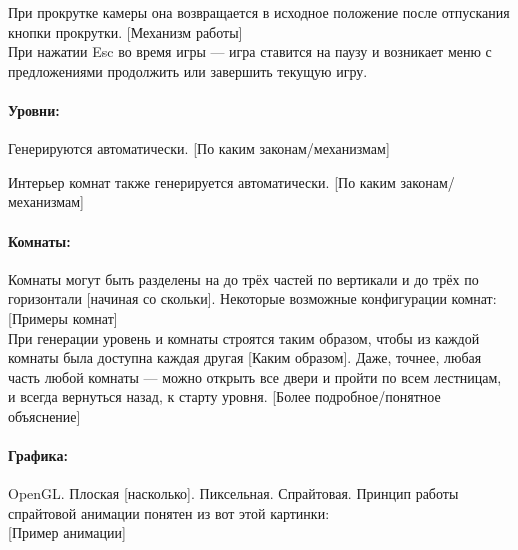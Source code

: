 \documentclass[12pt,a4paper]{article}
\begin{document}
При прокрутке камеры она возвращается в исходное положение после отпускания кнопки прокрутки. {\color{red} [Механизм работы]}\\

При нажатии Esc во время игры --- игра ставится на паузу и возникает меню с предложениями продолжить или завершить текущую игру.

\paragraph{Уровни:}
Генерируются автоматически. {\color{red} [По каким законам/механизмам]}

Интерьер комнат также генерируется автоматически. {\color{red} [По каким законам/механизмам]}\ans{[Аналогично]}

\paragraph{Комнаты:}
Комнаты могут быть разделены на до трёх частей по вертикали и до трёх по горизонтали{\color{red} [начиная со скольки]}\ans{[С одной]}. Некоторые возможные конфигурации комнат:\\

{\color{blue}[Примеры комнат]}\\

При генерации уровень и комнаты строятся таким образом, чтобы из каждой комнаты была доступна каждая другая {\color{red} [Каким образом]}. Даже, точнее, любая часть любой комнаты --- можно открыть все двери и пройти по всем лестницам, и всегда вернуться назад, к старту уровня. {\color{red} [Более подробное/понятное объяснение]}

\paragraph{Графика:}
OpenGL. Плоская {\color{red} [насколько]}\ans{[2D]}. Пиксельная. Спрайтовая. Принцип работы спрайтовой анимации понятен из вот этой картинки:\\

{\color{blue}[Пример анимации]}\\
\end{document}
